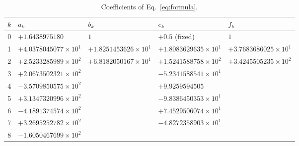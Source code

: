 \documentclass[aps,prd,onecolumn,superscriptaddress,nofootinbib,10pt]{revtex4-2}
\begin{document}
\begin{table}[htbp]
\caption{Coefficients of Eq.~\eqref{eq:formula}.}
\label{tab:coef}
\footnotesize
\begin{ruledtabular}
\begin{tabular}{rllll}
$k$ & $a_k$ & $b_k$ & $e_k$ & $f_k$ \\ \hline
0 & $+1.6438975180$ & $1$ & $+0.5$ (fixed) & $1$ \\
1 & $+4.0378045077\times10^{1}$ & $+1.8251453626\times10^{1}$ & $+1.8083629635\times10^{1}$ & $+3.7683686025\times10^{1}$ \\
2 & $+2.5233285989\times10^{2}$ & $+6.8182050167\times10^{1}$ & $+1.5241588758\times10^{2}$ & $+3.4245505235\times10^{2}$ \\
3 & $+2.0673502321\times10^{2}$ & & $-5.2341588541\times10^{1}$ & \\
4 & $-3.5709850575\times10^{2}$ & & $+9.9259594505$ & \\
5 & $+3.1347320996\times10^{2}$ & & $-9.8386450353\times10^{1}$ & \\
6 & $-4.1891374574\times10^{2}$ & & $+7.4529506074\times10^{1}$ & \\
7 & $+3.2695252782\times10^{2}$ & & $-4.8272358903\times10^{1}$ & \\
8 & $-1.6050467699\times10^{2}$ & & & \\
\end{tabular}
\end{ruledtabular}
\end{table}
\end{document}
